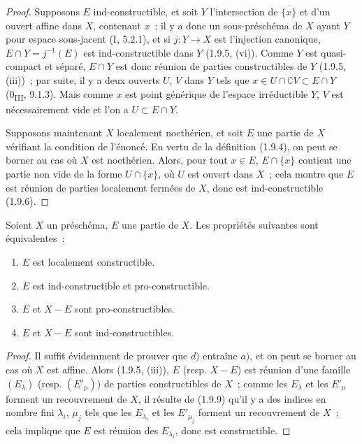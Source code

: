 \begin{proof}
Supposons $E$ ind-constructible, et soit $Y$ l'intersection de
$\overline{\{x\}}$ et d'un ouvert affine dans $X$, contenant $x$~; il y a
donc un sous-préschéma de $X$ ayant $Y$ pour espace sous-jacent (I, 5.2.1),
et si $j:Y\to X$ est l'injection canonique,
$E\cap Y=j^{-1}(E)$ est ind-constructible dans $Y$ (1.9.5, (vi)). Comme $Y$
est quasi-compact et séparé, $E\cap Y$ est donc réunion de parties
constructibles de $Y$ (1.9.5, (iii))~; par suite, il y a deux ouverts $U$,
$V$ dans $Y$ tels que
$x\in U\cap\complement V\subset E\cap Y$ (0\textsubscript{III}, 9.1.3).
Mais comme $x$ est point générique de l'espace irréductible $Y$, $V$ est
nécessairement vide et l'on a $U\subset E\cap Y$.

Supposons maintenant $X$ localement noethérien, et soit $E$ une partie de
$X$ vérifiant la condition de l'énoncé. En vertu de la définition (1.9.4),
on peut se borner au cas où $X$ est noethérien. Alors, pour tout $x\in E$,
$E\cap\overline{\{x\}}$ contient une partie non vide de la forme
$U\cap\overline{\{x\}}$, où $U$ est ouvert dans $X$~; cela montre que $E$
est réunion de parties localement fermées de $X$, donc est
ind-constructible (1.9.6).
\end{proof}

\begin{proposition}[1.9.11]
\label{IV.1.9.11-fr}
Soient $X$ un préschéma, $E$ une partie de $X$. Les propriétés suivantes sont
équivalentes~:
\begin{enumerate}
  \item[a)] $E$ est localement constructible.
  \item[b)] $E$ est ind-constructible et pro-constructible.
  \item[c)] $E$ et $X-E$ sont pro-constructibles.
  \item[d)] $E$ et $X-E$ sont ind-constructibles.
\end{enumerate}
\end{proposition}

\begin{proof}
Il suffit évidemment de prouver que $d)$ entraîne $a)$, et on peut se borner
au cas où $X$ est affine. Alors (1.9.5, (iii)), $E$ (resp. $X-E$) est réunion
d'une famille $(E_\lambda)$ (resp. $(E'_\mu)$) de parties constructibles de
$X$~; comme les $E_\lambda$ et les $E'_\mu$ forment un recouvrement de $X$,
il résulte de (1.9.9) qu'il y a des indices en nombre fini $\lambda_i$,
$\mu_j$ tels que les $E_{\lambda_i}$ et les $E'_{\mu_j}$ forment un
recouvrement de $X$~; cela implique que $E$ est réunion des
$E_{\lambda_i}$, donc est constructible.
\end{proof}

